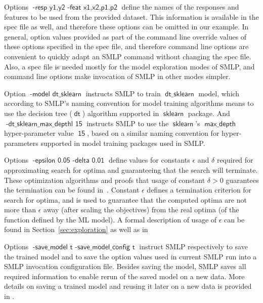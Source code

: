 \documentclass[a4paper,parskip=half]{article} %
\newcommand*\option[1]{\operatorname{\mathsf{#1}}} %
\newcommand*\optionval[2]{\operatorname{\mathsf{#1}\,\,\mathsf{#2}}} %
\newcommand*\package[1]{\operatorname{\mathsf{#1}}} %
\newcommand*\model[1]{\operatorname{\mathsf{#1}}} %
\begin{document}
Options $\option{-resp\,\,y1,y2\,\,-feat\,\,x1,x2,p1,p2}$ define the names of the responses and features to be used from 
the provided dataset. This information is available in the spec file as well, and therefore these options can be omitted
in our example. In general, option values provided as part of the command line override values of these options
specified in the spec file, and therefore command line options are convenient to quickly adapt an SMLP command
without changing the spec file. Also, a spec file is needed mostly for the model exploration modes of SMLP, and 
command line options make invocation of SMLP in other modes simpler.

Option $\optionval{-model}{dt\_sklearn}$ instructs SMLP to train $\model{dt\_sklearn}$ model, 
which according to SMLP's naming convention for model training algorithms 
means to use the decision tree ($\model{dt}$) algorithm supported in $\package{sklearn}$ package.  
And $\optionval{-dt\_sklearn\_max\_depthl}{15}$ instructs SMLP to use the $\package{sklearn}$'s 
$\option{max\_depth}$ hyper-parameter value $\option{15}$, based on a similar naming convention
for hyper-parameters supported in model training packages used in SMLP.

Options $\option{-epsilon \,\, 0.05\,\,-delta\,\,0.01}$ define values for constants $\epsilon$ and $\delta$   
required for approximating search for optima and guaranteeing that the search will terminate. 
These optimization algorithms and proofs that usage of constant $\delta > 0$ guarantees the termination can be found
in~\cite{DBLP:conf/fmcad/BrausseKK20,DBLP:conf/ijcai/BrausseKK22}. Constant $\epsilon$ defines a termination criterion
for search for optima, and is used to guarantee that the computed optima are not more than $\epsilon$ away 
(after scaling the objectives) from the real optima (of the function defined by the ML model).
A formal description of usage of $\epsilon$ can be found in Section~\ref{sec:exploration} as well as 
in~\cite{DBLP:conf/fmcad/BrausseKK20,DBLP:conf/ijcai/BrausseKK22}

Options $\option{-save\_model\,\,t \,\,-save\_model\_config\,\,t}$ instruct SMLP respectively to save the trained 
model and to save the option values used in current SMLP run into a SMLP invocation configuration file. 
Besides saving the model, SMLP saves all required information to enable rerun of the saved model on a new data. 
More details on saving a trained model and reusing it later on a new data is provided in . 
\end{document}
